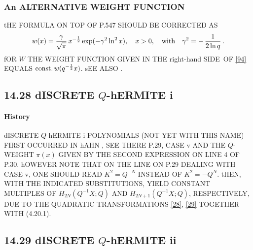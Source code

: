 \documentclass[twoside,11pt]{article}
\newcommand\ga\gamma
\newcommand\half{\frac12}
\newcommand\const{{\rm const.}\,}
\newcommand\RHS{right-hand SIDE}
\begin{document}
\subsubsection*{An ALTERNATIVE WEIGHT FUNCTION} 
tHE FORMULA ON TOP OF P.547 SHOULD BE CORRECTED AS 
\begin{equation} 
w(x)=\frac\ga{\sqrt\pi}\,x^{-\half}\exp(-\ga^2\ln^2 x),\quad x>0,\quad 
{\rm with}\quad\ga^2=-\,\frac1{2\ln q}\,. 
\label{94} 
\end{equation} 
fOR $W$ THE WEIGHT FUNCTION GIVEN IN  THE \RHS\ OF \eqref{94} 
EQUALS $\const w(q^{-\half}x)$. sEE ALSO 
. 
% 
\subsection*{14.28 dISCRETE $Q$-hERMITE i} 
\label{sec14.28} 
% 
\paragraph{History} 
dISCRETE $Q$ hERMITE i POLYNOMIALS (NOT YET WITH THIS NAME) FIRST OCCURRED IN 
hAHN , SEE THERE P.29, CASE v AND THE $Q$-WEIGHT $\pi(x)$ GIVEN BY 
THE SECOND EXPRESSION ON LINE 4 OF P.30. hOWEVER NOTE THAT ON THE LINE ON P.29 DEALING WITH 
CASE v, ONE SHOULD READ $K^2=Q^{-N}$ INSTEAD OF $K^2=-Q^N$. tHEN, WITH THE INDICATED 
SUBSTITUTIONS,   YIELD CONSTANT MULTIPLES OF 
$H_{2N}(Q^{-1}X;Q)$ AND $H_{2N+1}(Q^{-1}X;Q)$, RESPECTIVELY, 
 DUE TO THE QUADRATIC TRANSFORMATIONS \eqref{28}, \eqref{29} TOGETHER WITH  (4.20.1). 
% 
\subsection*{14.29 dISCRETE $Q$-hERMITE ii} 
\label{sec14.29} 
% 
\end{document}
